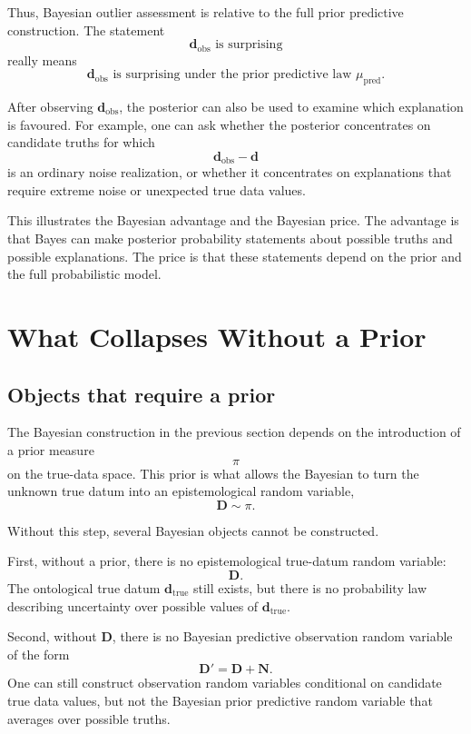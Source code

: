 \documentclass[11pt]{article}
\newcommand{\prior}{\pi}
\newcommand{\Drand}{\mathbf D}
\newcommand{\Dobsrand}{\mathbf D'}
\newcommand{\Nrand}{\mathbf N}
\newcommand{\dtrue}{\mathbf d_{\mathrm{true}}}
\newcommand{\dobs}{\mathbf d_{\mathrm{obs}}}
\begin{document}
Thus, Bayesian outlier assessment is relative to the full prior predictive construction. The statement
\[
    \dobs
    \text{ is surprising}
\]
really means
\[
    \dobs
    \text{ is surprising under the prior predictive law }
    \mu_{\mathrm{pred}}.
\]

After observing \(\dobs\), the posterior can also be used to examine which explanation is favoured. For example, one can ask whether the posterior concentrates on candidate truths for which
\[
    \dobs-\mathbf d
\]
is an ordinary noise realization, or whether it concentrates on explanations that require extreme noise or unexpected true data values.

This illustrates the Bayesian advantage and the Bayesian price. The advantage is that Bayes can make posterior probability statements about possible truths and possible explanations. The price is that these statements depend on the prior and the full probabilistic model.

\section{What Collapses Without a Prior}

\subsection{Objects that require a prior}

The Bayesian construction in the previous section depends on the introduction of a prior measure
\[
    \prior
\]
on the true-data space. This prior is what allows the Bayesian to turn the unknown true datum into an epistemological random variable,
\[
    \Drand\sim\prior.
\]

Without this step, several Bayesian objects cannot be constructed.

First, without a prior, there is no epistemological true-datum random variable:
\[
    \Drand.
\]
The ontological true datum \(\dtrue\) still exists, but there is no probability law describing uncertainty over possible values of \(\dtrue\).

Second, without \(\Drand\), there is no Bayesian predictive observation random variable of the form
\[
    \Dobsrand=\Drand+\Nrand.
\]
One can still construct observation random variables conditional on candidate true data values, but not the Bayesian prior predictive random variable that averages over possible truths.
\end{document}
